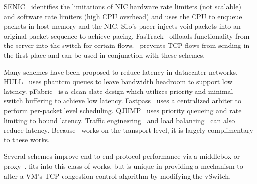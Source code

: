 SENIC~\cite{niranjan2013fastrak} 
identifies the limitations of NIC hardware rate limiters (\ie{}not scalable) and 
software rate limiters (\ie{}high CPU overhead) and uses the CPU to enqueue packets 
in host memory and the NIC. Silo's pacer injects void packets into 
an original packet sequence to achieve pacing. FasTrack~\cite{niranjan2013fastrak} offloads
functionality from the server into the switch for certain flows.~\acdc{} prevents
TCP flows from sending in the first place and can be used in conjunction with these
schemes.


Many schemes have been proposed to reduce latency in datacenter networks.
HULL~\cite{alizadeh2012less} uses phantom queues to leave bandwidth headroom to support low latency.
pFabric~\cite{alizadeh2013pfabric} is a clean-slate
design which utilizes priority and minimal switch buffering to achieve low latency.
Fastpass~\cite{perry2014fastpass} uses a centralized arbiter to
perform per-packet level scheduling.
QJUMP~\cite{qjump} uses priority queueing and rate limiting to
bound latency. Traffic engineering~\cite{al2010hedera,rasley2014planck} and 
load balancing~\cite{alizadeh2014conga,he2015presto,ghorbani2015micro} can also
reduce latency. Because~\acdc{} works on the transport level, it is
largely complimentary to these works.

Several schemes improve end-to-end protocol performance via a middlebox
or proxy~\cite{RFC3449,RFC3115,balakrishnan2008maelstrom,davern2011httpep,balakrishnan1995improving}.
\acdc{} fits into this class of works, but is unique in providing a mechanism
to alter a VM's TCP congestion control algorithm by modifying the vSwitch.

